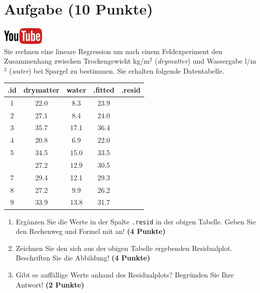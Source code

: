 \documentclass[a4paper, 10pt]{scrartcl}\usepackage[]{graphicx}\usepackage[]{xcolor}
\newenvironment{knitrout}{}{} %
\begin{document}
 
\clearpage

\section{Aufgabe \hfill (10 Punkte)}

\hfill\href{https://youtu.be/dyQlYV9nOqY}{\includegraphics[width =
  2cm]{img/youtube}}\\[1Ex]

Sie rechnen eine lineare Regression um nach einem Feldexperiment den
Zusammenhang zwischen Trockengewicht kg/m$^2$ (\textit{drymatter}) und
Wassergabe l/m$^2$ (\textit{water}) bei Spargel zu bestimmen. Sie erhalten
folgende Datentabelle.

\begin{knitrout}
\color{fgcolor}\begin{table}[!h]
\centering\begingroup\fontsize{12}{14}\selectfont

\begin{tabular}{ccccc}
\toprule
.id & drymatter & water & .fitted & .resid\\
\midrule
1 & 22.0 & 8.3 & 23.9 & \\
2 & 27.1 & 8.4 & 24.0 & \\
3 & 35.7 & 17.1 & 36.4 & \\
4 & 20.8 & 6.9 & 22.0 & \\
5 & 34.5 & 15.0 & 33.5 & \\
\addlinespace
6 & 27.2 & 12.9 & 30.5 & \\
7 & 29.4 & 12.1 & 29.3 & \\
8 & 27.2 & 9.9 & 26.2 & \\
9 & 33.9 & 13.8 & 31.7 & \\
\bottomrule
\end{tabular}
\endgroup{}
\end{table}

\end{knitrout}

\begin{enumerate}
\item Erg{\"a}nzen Sie die Werte in der Spalte \texttt{.resid} in der obigen
  Tabelle. Geben Sie den Rechenweg und Formel mit an! \textbf{(4 Punkte)}
\item Zeichnen Sie den sich aus der obigen Tabelle ergebenden
  Residualplot. Beschriften Sie die Abbildung! \textbf{(4 Punkte)}
\item Gibt es auff{\"a}llige Werte anhand des Residualplots? Begr{\"u}nden Sie Ihre
  Antwort! \textbf{(2 Punkte)}
\end{enumerate}
 
\end{document}
